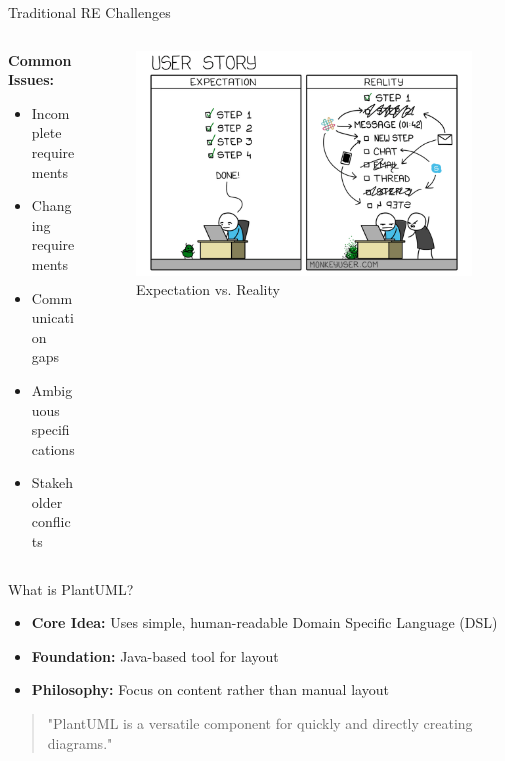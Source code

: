 \documentclass{beamer}
\begin{document}
\begin{frame}[t]{Traditional RE Challenges}
    \begin{columns}
        \begin{column}{0.5\textwidth}
            \textbf{Common Issues:}
            \begin{itemize}
                \item Incomplete requirements
                \item Changing requirements
                \item Communication gaps
                \item Ambiguous specifications
                \item Stakeholder conflicts
            \end{itemize}
        \end{column}
        \begin{column}{0.5\textwidth}
            \centering
            \begin{figure}
                \includegraphics[width=\textwidth]{images/162-user-story.png} %
                \caption{Expectation vs. Reality}
            \end{figure}
        \end{column}
    \end{columns}
\end{frame}

\begin{frame}[t]{What is PlantUML?}
    \begin{itemize}
        \item \textbf{Core Idea:} Uses simple, human-readable Domain Specific Language (DSL)
        \item \textbf{Foundation:} Java-based tool for layout
        \item \textbf{Philosophy:} Focus on content rather than manual layout
    \end{itemize}
    
    \begin{quote}
        "PlantUML is a versatile component for quickly and directly creating diagrams."
    \end{quote}
\end{frame}
\end{document}
